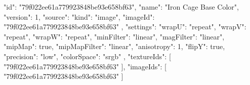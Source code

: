 {
  "id": "79f022ee61a779923848be93e658bf63",
  "name": "Iron Cage Base Color",
  "version": 1,
  "source": {
    "kind": "image",
    "imageId": "79f022ee61a779923848be93e658bf63"
  },
  "settings": {
    "wrapU": "repeat",
    "wrapV": "repeat",
    "wrapW": "repeat",
    "minFilter": "linear",
    "magFilter": "linear",
    "mipMap": true,
    "mipMapFilter": "linear",
    "anisotropy": 1,
    "flipY": true,
    "precision": "low",
    "colorSpace": "srgb"
  },
  "textureIds": [
    "79f022ee61a779923848be93e658bf63"
  ],
  "imageIds": [
    "79f022ee61a779923848be93e658bf63"
  ]
}
